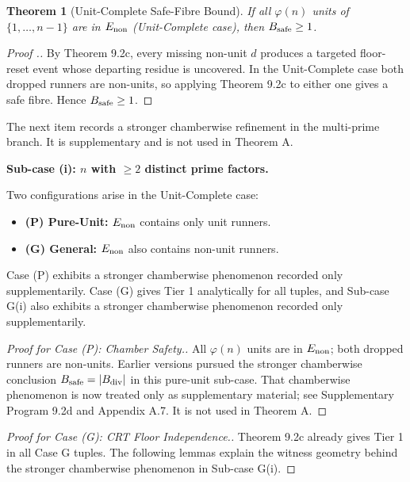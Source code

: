 \documentclass[11pt,a4paper]{article}
\theoremstyle{plain}
\newtheorem{theorem}{Theorem}[section]
\theoremstyle{definition}
\theoremstyle{remark}
\begin{document}
\begin{theorem}[Unit-Complete Safe-Fibre Bound]
If all $\varphi(n)$ units of $\{1,\ldots,n-1\}$ are in $E_{\rm non}$ (Unit-Complete case), then $B_{\rm safe} \geq 1$.

\end{theorem}

\begin{proof}[Proof .]
By Theorem 9.2c, every missing non-unit $d$ produces a targeted floor-reset event whose departing residue is uncovered. In the Unit-Complete case both dropped runners are non-units, so applying Theorem 9.2c to either one gives a safe fibre. Hence $B_{\rm safe} \geq 1$.
\end{proof}

The next item records a stronger chamberwise refinement in the multi-prime branch. It is supplementary and is not used in Theorem A.


\medskip


\textbf{Sub-case (i): $n$ with $\geq 2$ distinct prime factors.}

Two configurations arise in the Unit-Complete case:
\begin{itemize}
\item \textbf{(P) Pure-Unit:} $E_{\rm non}$ contains only unit runners.
\item \textbf{(G) General:} $E_{\rm non}$ also contains non-unit runners.
\end{itemize}

Case (P) exhibits a stronger chamberwise phenomenon recorded only supplementarily.
Case (G) gives Tier 1 analytically for all tuples, and Sub-case G(i) also exhibits a stronger chamberwise phenomenon recorded only supplementarily.

\begin{proof}[Proof for Case (P): Chamber Safety.]

All $\varphi(n)$ units are in $E_{\rm non}$; both dropped runners are non-units. Earlier versions pursued the stronger chamberwise conclusion $B_{\rm safe} = |B_{\rm div}|$ in this pure-unit sub-case. That chamberwise phenomenon is now treated only as supplementary material; see Supplementary Program 9.2d and Appendix A.7. It is not used in Theorem A.
\end{proof}

\begin{proof}[Proof for Case (G): CRT Floor Independence.]

Theorem 9.2c already gives Tier 1 in all Case G tuples. The following lemmas explain the witness geometry behind the stronger chamberwise phenomenon in Sub-case G(i).

\end{proof}
\end{document}
